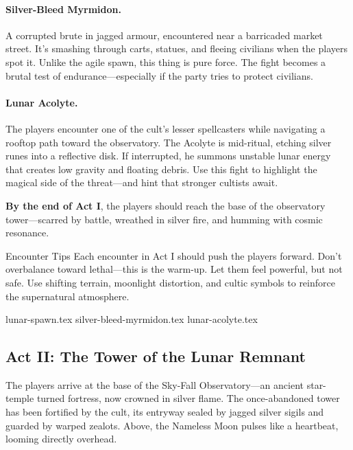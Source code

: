\paragraph{Silver-Bleed Myrmidon.}
A corrupted brute in jagged armour, encountered near a barricaded market street. It’s smashing through carts, statues, and fleeing civilians when the players spot it. Unlike the agile spawn, this thing is pure force. The fight becomes a brutal test of endurance—especially if the party tries to protect civilians.

\paragraph{Lunar Acolyte.}
The players encounter one of the cult’s lesser spellcasters while navigating a rooftop path toward the observatory. The Acolyte is mid-ritual, etching silver runes into a reflective disk. If interrupted, he summons unstable lunar energy that creates low gravity and floating debris. Use this fight to highlight the magical side of the threat—and hint that stronger cultists await.

\textbf{By the end of Act I}, the players should reach the base of the observatory tower—scarred by battle, wreathed in silver fire, and humming with cosmic resonance.


\begin{CommentBox}{Encounter Tips}
    Each encounter in Act I should push the players forward. Don’t overbalance toward lethal—this is the warm-up. Let them feel powerful, but not safe. Use shifting terrain, moonlight distortion, and cultic symbols to reinforce the supernatural atmosphere.
\end{CommentBox}



{lunar-spawn.tex}
{silver-bleed-myrmidon.tex}
{lunar-acolyte.tex}



\subsection{Act II: The Tower of the Lunar Remnant}

The players arrive at the base of the Sky-Fall Observatory—an ancient star-temple turned fortress, now crowned in silver flame. The once-abandoned tower has been fortified by the cult, its entryway sealed by jagged silver sigils and guarded by warped zealots. Above, the Nameless Moon pulses like a heartbeat, looming directly overhead.

